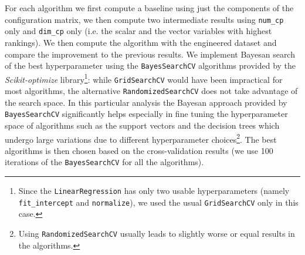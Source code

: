     For each algorithm we first compute a baseline using just the components of the configuration matrix, we then compute two intermediate results using \texttt{num\_cp} only and \texttt{dim\_cp} only (i.e. the scalar and the vector variables with highest rankings). We then compute the algorithm with the engineered dataset and compare the improvement to the previous results. We implement Bayesan search of the best hyperparameter using the \texttt{BayesSearchCV} algorithms provided by the \textit{Scikit-optimize} library\footnote{Since the \texttt{LinearRegression} has only two usable hyperparameters (namely \texttt{fit\_intercept} and \texttt{normalize}), we used the usual \texttt{GridSearchCV} only in this case.}: while \texttt{GridSearchCV} would have been impractical for most algorithms, the alternative \texttt{RandomizedSearchCV} does not take advantage of the search space. In this particular analysis the Bayesan approach provided by \texttt{BayesSearchCV} significantly helps especially in fine tuning the hyperparameter space of algorithms such as the support vectors and the decision trees which undergo large variations due to different hyperparameter choices\footnote{Using \texttt{RandomizedSearchCV} usually leads to slightly worse or equal results in the algorithms.}. The best algorithms is then chosen based on the cross-validation results (we use 100 iterations of the \texttt{BayesSearchCV} for all the algorithms).

